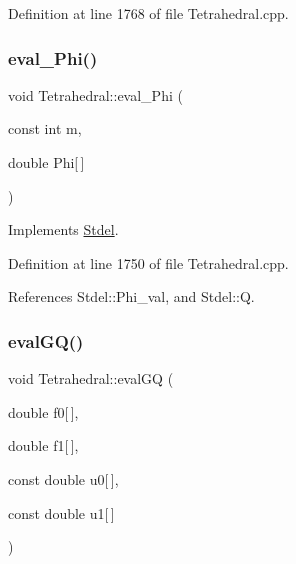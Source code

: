 Definition at line 1768 of file Tetrahedral.\+cpp.

\mbox{\label{classTetrahedral_ac0dec119fa6faa28f52ca8416e0214b2}} 
\subsubsection{\texorpdfstring{eval\+\_\+\+Phi()}{eval\_Phi()}}
{\footnotesize\ttfamily void Tetrahedral\+::eval\+\_\+\+Phi (\begin{DoxyParamCaption}\item[{const int}]{m,  }\item[{double}]{Phi\mbox{[}$\,$\mbox{]} }\end{DoxyParamCaption})\hspace{0.3cm}{\ttfamily [virtual]}}



Implements \hyperlink{classStdel_a2aa6ea12ceaa1fa4a7f63909ce41bc0b}{Stdel}.



Definition at line 1750 of file Tetrahedral.\+cpp.



References Stdel\+::\+Phi\+\_\+val, and Stdel\+::Q.

\mbox{\label{classTetrahedral_aa32a1da52c137fd89f72af9bbfbf1524}} 
\subsubsection{\texorpdfstring{eval\+G\+Q()}{evalGQ()}\hspace{0.1cm}{\footnotesize\ttfamily [1/2]}}
{\footnotesize\ttfamily void Tetrahedral\+::eval\+GQ (\begin{DoxyParamCaption}\item[{double}]{f0\mbox{[}$\,$\mbox{]},  }\item[{double}]{f1\mbox{[}$\,$\mbox{]},  }\item[{const double}]{u0\mbox{[}$\,$\mbox{]},  }\item[{const double}]{u1\mbox{[}$\,$\mbox{]} }\end{DoxyParamCaption})\hspace{0.3cm}{\ttfamily [virtual]}}



